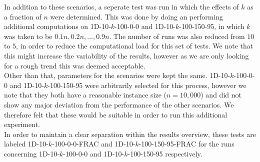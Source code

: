\documentclass{article}
\begin{document}
In addition to these scenarios, a seperate test was run in which the effects of $k$ as a fraction of $n$ were determined. This was done by doing an performing additional computations on 1D-10-$k$-100-0-0 and 1D-10-$k$-100-150-95, in which $k$ was taken to be $0.1n, 0.2n, ..., 0.9n$. The number of runs was also reduced from $10$ to $5$, in order to reduce the computational load for this set of tests. We note that this might increase the variability of the results, however as we are only looking for a rough trend this was deemed acceptable.\\ Other than that, parameters for the scenarios were kept the same. 1D-10-$k$-100-0-0 and 1D-10-$k$-100-150-95 were arbitrarily selected for this process, however we note that they both have a reasonable instance size ($n=10,000$) and did not show any major deviation from the performance of the other scenarios. We therefore felt that these would be suitable in order to run this additional experiment. \\
In order to maintain a clear separation within the results overview, these tests are labeled 1D-10-$k$-100-0-0-FRAC and 1D-10-$k$-100-150-95-FRAC for the runs concerning 1D-10-$k$-100-0-0 and 1D-10-$k$-100-150-95 respectively.
\end{document}
